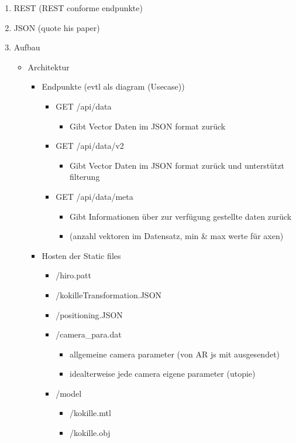 \begin{enumerate}
	\item REST (REST conforme endpunkte)
	\item JSON (quote his paper)
	\item Aufbau
	\begin{itemize}
		\item Architektur
		\begin{itemize}
			\item Endpunkte (evtl als diagram (Usecase))
			\begin{itemize}
				\item GET /api/data
				\begin{itemize}
					\item Gibt Vector Daten im JSON format zurück
				\end{itemize}
				
				\item GET /api/data/v2
				\begin{itemize}
					\item Gibt Vector Daten im JSON format zurück und unterstützt filterung
				\end{itemize}
				
				\item GET /api/data/meta
				\begin{itemize}
					\item Gibt Informationen über zur verfügung gestellte daten zurück
					\item (anzahl vektoren im Datensatz, min \& max werte für axen)
				\end{itemize}
			\end{itemize}
			
			\item Hosten der Static files
			\begin{itemize}
				\item /hiro.patt
				\item /kokilleTransformation.JSON
				\item /positioning.JSON
				\item /camera\_para.dat
				\begin{itemize}
					\item allgemeine camera parameter (von AR js mit ausgesendet)
					\item idealterweise jede camera eigene parameter (utopie)
				\end{itemize}
				
				\item /model
				\begin{itemize}
					\item /kokille.mtl
					\item /kokille.obj
				\end{itemize}
			\end{itemize}
		\end{itemize}
			

\end{itemize}
\end{enumerate}

